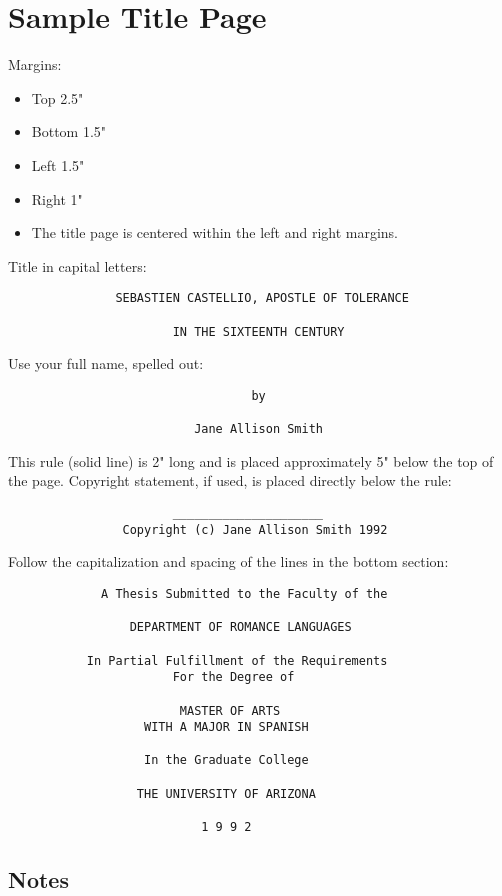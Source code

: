 \documentclass[draft]{ua-thesis}
\begin{document}
\section{Sample Title Page}

Margins:
\begin{itemize}
   \item Top 2.5"
   \item Bottom 1.5"
   \item Left 1.5"
   \item Right 1"
   \item The title page is centered within the left and right margins.
\end{itemize}
Title in capital letters:
\begin{verbatim}
               SEBASTIEN CASTELLIO, APOSTLE OF TOLERANCE

                       IN THE SIXTEENTH CENTURY
\end{verbatim}
Use your full name, spelled out:
\begin{verbatim}
                                  by

                          Jane Allison Smith
\end{verbatim}
This rule (solid line) is 2" long and is placed approximately 5" below the
top of the page. Copyright statement, if used, is placed directly below the
rule:
\begin{verbatim}
                       _____________________
                Copyright (c) Jane Allison Smith 1992
\end{verbatim}
Follow the capitalization and spacing of the lines in the bottom section:
\begin{verbatim}
             A Thesis Submitted to the Faculty of the

                 DEPARTMENT OF ROMANCE LANGUAGES

           In Partial Fulfillment of the Requirements
                       For the Degree of

                        MASTER OF ARTS
                   WITH A MAJOR IN SPANISH

                   In the Graduate College

                  THE UNIVERSITY OF ARIZONA

                           1 9 9 2
\end{verbatim}

\subsection{Notes}
\end{document}
